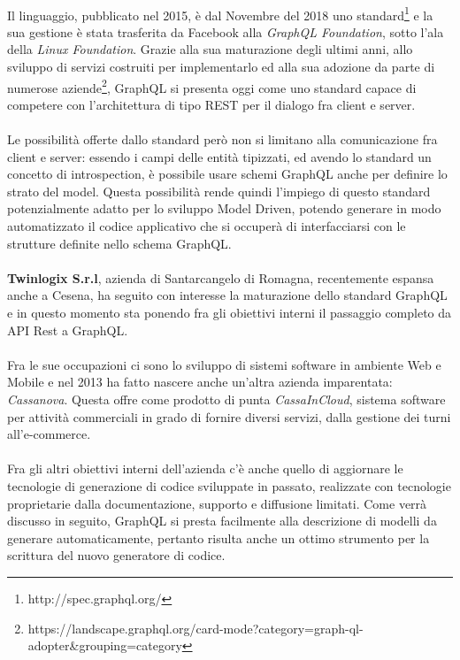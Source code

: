 \documentclass[a4paper, 12pt]{report}
\begin{document}
    \paragraph*{}
      Il linguaggio, pubblicato nel 2015, è dal Novembre del 2018 uno standard\footnote{http://spec.graphql.org/} e la sua gestione è stata trasferita da Facebook alla \emph{GraphQL Foundation}, sotto l'ala della \emph{Linux Foundation}.
      Grazie alla sua maturazione degli ultimi anni, allo sviluppo di servizi costruiti per implementarlo ed alla sua adozione da parte di numerose aziende\footnote{https://landscape.graphql.org/card-mode?category=graph-ql-adopter\&grouping=category}, GraphQL si presenta oggi come uno standard capace di competere con l'architettura di tipo REST per il dialogo fra client e server.
    \paragraph*{}
      Le possibilità offerte dallo standard però non si limitano alla comunicazione fra client e server: essendo i campi delle entità tipizzati, ed avendo lo standard un concetto di introspection, è possibile usare 
      schemi GraphQL anche per definire lo strato del model.
      Questa possibilità rende quindi l'impiego di questo standard potenzialmente adatto per lo sviluppo Model Driven, potendo generare in modo automatizzato il codice applicativo che si occuperà di interfacciarsi con le strutture definite nello schema GraphQL.
    \paragraph*{}
      \textbf{Twinlogix S.r.l}, azienda di Santarcangelo di Romagna, recentemente espansa anche a Cesena, ha seguito con interesse la maturazione dello standard GraphQL e in questo momento sta ponendo fra gli obiettivi interni il passaggio completo da API Rest a GraphQL.
    \paragraph*{}
      Fra le sue occupazioni ci sono lo sviluppo di sistemi software in ambiente Web e Mobile e nel 2013 ha fatto nascere anche un'altra azienda imparentata: \emph{Cassanova}.
      Questa offre come prodotto di punta \emph{CassaInCloud}, sistema software per attività commerciali in grado di fornire diversi servizi, dalla gestione dei turni all'e-commerce.
    \paragraph*{}
      Fra gli altri obiettivi interni dell'azienda c'è anche quello di aggiornare le tecnologie di generazione di codice sviluppate in passato, realizzate con tecnologie proprietarie dalla documentazione, supporto e diffusione limitati.
      Come verrà discusso in seguito, GraphQL si presta facilmente alla descrizione di modelli da generare automaticamente, pertanto risulta anche un ottimo strumento per la scrittura del nuovo generatore di codice.
\end{document}
